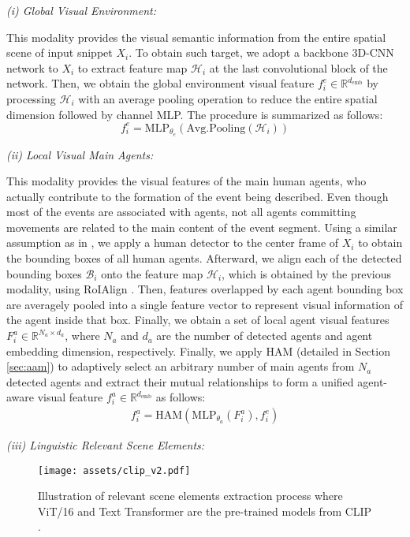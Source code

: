\documentclass[letterpaper]{article} \usepackage{aaai23}  \usepackage{times}  \usepackage{helvet}  \usepackage{courier}  \usepackage[hyphens]{url}  \usepackage{graphicx} \urlstyle{rm} \def\UrlFont{\rm}  \usepackage{natbib}  \usepackage{caption} \frenchspacing  \setlength{\pdfpagewidth}{8.5in}  \setlength{\pdfpageheight}{11in}  \usepackage{algorithm}
\begin{document}
\noindent
\textit{(i) Global Visual Environment:}

This modality provides the visual semantic information from the entire spatial scene of input snippet $X_i$. To obtain such target, we adopt a backbone 3D-CNN network \cite{C3D} to $X_i$ to extract feature map $\mathcal{H}_i$ at the last convolutional block of the network. Then, we obtain the global environment visual feature $f^e_i \in\mathbb{R}^{d_\text{emb}}$ by processing $\mathcal{H}_i$ with an average pooling operation to reduce the entire spatial dimension followed by channel MLP. The procedure is summarized as follows:
\begin{equation}
    f^e_i = \text{MLP}_{\theta_e}(\text{Avg.Pooling}(\mathcal{H}_i))
\end{equation}

\noindent
\textit{(ii) Local Visual Main Agents:}

This modality provides the visual features of the main human agents, who actually contribute to the formation of the event being described. Even though most of the events are associated with agents, not all agents committing movements are related to the main content of the event segment.
Using a similar assumption as in \cite{KhoaVo_ICASSP, KhoaVo_Access}, we apply a human detector to the center frame of $X_i$ to obtain the bounding boxes of all human agents. 
Afterward, we align each of the detected bounding boxes $\mathcal{B}_i$ onto the feature map $\mathcal{H}_i$, which is obtained by the previous modality, using RoIAlign \cite{MaskRCNN_ICCV17}. Then, features overlapped by each agent bounding box are averagely pooled into a single feature vector to represent visual information of the agent inside that box. Finally, we obtain a set of local agent visual features $F^a_i\in\mathbb{R}^{N_a\times d_a}$, where $N_a$ and $d_a$ are the number of detected agents and agent embedding dimension, respectively.
Finally, we apply HAM (detailed in Section \ref{sec:aam}) to adaptively select an arbitrary number of main agents from $N_a$ detected agents and extract their mutual relationships to form a unified agent-aware visual feature $f^{a}_i \in \mathbb{R}^{d_\text{emb}}$ as follows:
\begin{align}
 f_i^a = \text{HAM}(\text{MLP}_{\theta_a}(F_i^a), f_i^e)
\end{align}

\noindent
\textit{(iii) Linguistic Relevant Scene Elements:}
\label{sec:ling}

\begin{figure}[t]
\centering
  \texttt{[image: assets/clip\_v2.pdf]}
  \caption{Illustration of relevant scene elements extraction process where ViT/16 and Text Transformer are the pre-trained models from CLIP \cite{radford2021learning}.}\label{fig:lin_feat_v2}
 \vspace{-4mm}
\end{figure}
\end{document}
